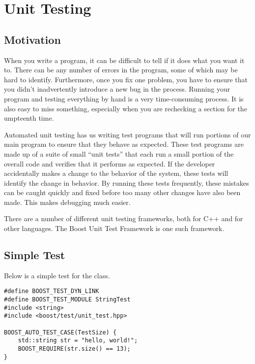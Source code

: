 \chapter{Unit Testing}\label{ch:UnitTesting}

\section{Motivation}\label{sec:testing-motivation}

When you write a program, it can be difficult to tell if it does what you want it to.
There can be any number of errors in the program, some of which may be hard to identify.
Furthermore, once you fix one problem, you have to ensure that you didn't inadvertently introduce a new bug in the process.
Running your program and testing everything by hand is a very time-consuming process.
It is also easy to miss something, especially when you are rechecking a section for the umpteenth time.

Automated unit testing has us writing test programs that will run portions of our main program to ensure that they behave as expected.
These test programs are made up of a suite of small ``unit tests'' that each run a small portion of the overall code and verifies that it performs as expected.
If the developer accidentally makes a change to the behavior of the system, these tests will identify the change in behavior.
By running these tests frequently, these mistakes can be caught quickly and fixed before too many other changes have also been made.
This makes debugging much easier.

There are a number of different unit testing frameworks, both for C++ and for other languages.
The Boost Unit Test Framework is one such framework.


\section{Simple Test}\label{sec:testing-simple}

Below is a simple test for the  class.

\begin{lstlisting}
#define BOOST_TEST_DYN_LINK
#define BOOST_TEST_MODULE StringTest
#include <string>
#include <boost/test/unit_test.hpp>

BOOST_AUTO_TEST_CASE(TestSize) {
	std::string str = "hello, world!";
	BOOST_REQUIRE(str.size() == 13);
}
\end{lstlisting}

